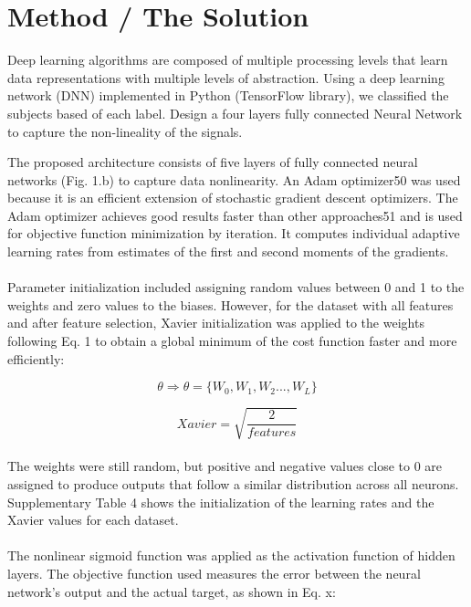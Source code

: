 \documentclass{llncs}       %
\begin{document}
\section{Method / The Solution}
\label{sec:3}
Deep learning algorithms are composed of multiple processing levels that learn data representations with multiple levels of abstraction. Using a deep learning network (DNN) implemented in Python (TensorFlow library), we classified the subjects based of each label.
Design a four layers fully connected Neural Network to capture the non-lineality of the signals.

The proposed architecture consists of five layers of fully connected neural networks (Fig. 1.b) to capture data nonlinearity. An Adam optimizer50 was used because it is an efficient extension of stochastic gradient descent optimizers. The Adam optimizer achieves good results faster than other approaches51 and is used for objective function minimization by iteration. It computes individual adaptive learning rates from estimates of the first and second moments of the gradients.
\paragraph{}
Parameter initialization included assigning random values between 0 and 1 to the weights and zero values to the biases. However, for the dataset with all features and after feature selection, Xavier initialization was applied to the weights following Eq. 1 to obtain a global minimum of the cost function faster and more efficiently:

\begin{equation} 
\theta\Rightarrow\theta=\{W_{0},W_{1},W_{2}...,W_{L}\}
\end{equation}

\begin{equation} 
Xavier = \sqrt{\frac{2}{features}}
\end{equation}

\paragraph{}
The weights were still random, but positive and negative values close to 0 are assigned to produce outputs that follow a similar distribution across all neurons. Supplementary Table 4 shows the initialization of the learning rates and the Xavier values for each dataset.

\paragraph{}
The nonlinear sigmoid function was applied as the activation function of hidden layers. The objective function used measures the error between the neural network’s output and the actual target, as shown in Eq. x:
\end{document}
